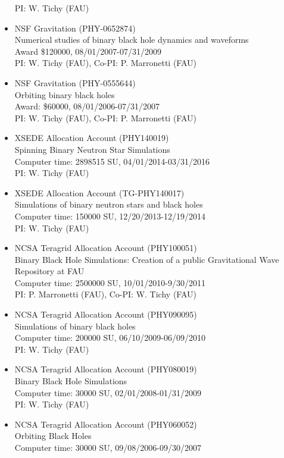 \documentclass[11pt]{article}
\begin{document}
\begin{itemize}
	PI: W. Tichy (FAU)
\item	NSF Gravitation (PHY-0652874)\\
	Numerical studies of binary black hole dynamics and waveforms\\
	Award \$120000, 08/01/2007-07/31/2009\\
	PI: W. Tichy (FAU), Co-PI: P. Marronetti (FAU)
\item	NSF Gravitation (PHY-0555644)\\
	Orbiting binary black holes\\
	Award: \$60000, 08/01/2006-07/31/2007\\
	PI: W. Tichy (FAU), Co-PI: P. Marronetti (FAU)
\item	XSEDE Allocation Account (PHY140019)\\
	Spinning Binary Neutron Star Simulations\\
	Computer time: 2898515 SU, 04/01/2014-03/31/2016\\
	PI: W. Tichy (FAU)
\item	XSEDE Allocation Account (TG-PHY140017)\\
	Simulations of binary neutron stars and black holes\\
	Computer time: 150000 SU, 12/20/2013-12/19/2014\\
	PI: W. Tichy (FAU)
\item	NCSA Teragrid Allocation Account (PHY100051)\\
	Binary Black Hole Simulations:
	Creation of a public Gravitational Wave Repository at FAU\\
	Computer time: 2500000 SU, 10/01/2010-9/30/2011\\
	PI: P. Marronetti (FAU), Co-PI: W. Tichy (FAU)
\item	NCSA Teragrid Allocation Account (PHY090095)\\
	Simulations of binary black holes\\
	Computer time: 200000 SU, 06/10/2009-06/09/2010\\
	PI: W. Tichy (FAU)
\item	NCSA Teragrid Allocation Account (PHY080019)\\
	Binary Black Hole Simulations\\
	Computer time: 30000 SU, 02/01/2008-01/31/2009\\
	PI: W. Tichy (FAU)
\item	NCSA Teragrid Allocation Account (PHY060052)\\
	Orbiting Black Holes\\
	Computer time: 30000 SU, 09/08/2006-09/30/2007\\

\end{itemize}
\end{document}
